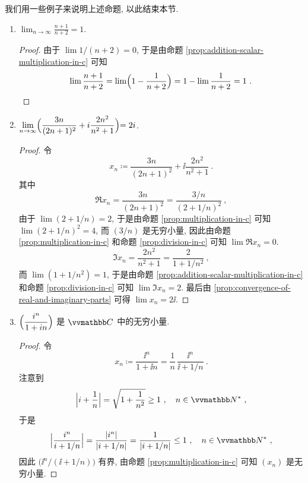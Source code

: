 我们用一些例子来说明上述命题, 以此结束本节.

\begin{example}
    \begin{enumerate}
        \item \(\displaystyle \lim_{n \to \infty} \frac{n + 1}{n + 2} = 1\).
        \begin{proof}
            由于 \(\lim 1 / (n + 2) = 0\), 于是由命题 \ref{prop:addition-scalar-multiplication-in-c} 可知
            \[
                \lim \frac{n + 1}{n + 2} = \lim\Bigl(1 - \frac{1}{n + 2}\Bigr) = 1 - \lim \frac{1}{n + 2} = 1\ .
            \]
        \end{proof}
        \item \(\displaystyle \lim_{n \to \infty} \Bigr(\frac{3 n}{(2 n + 1)^2} + i \frac{2 n^2}{n^2 + 1}\Bigl) = 2 i\).
        \begin{proof}
            令
            \[
                x_n \coloneqq \frac{3 n}{(2 n + 1)^2} + \ii \frac{2 n^2}{n^2 + 1}\ .
            \]
            其中
            \[
                \Re x_n = \frac{3 n}{(2 n + 1)^2} = \frac{3 / n}{(2 + 1 / n)^2}\ ,
            \]
            由于 \(\lim(2 + 1 / n) = 2\), 于是由命题 \ref{prop:multiplication-in-c} 可知 \(\lim(2 + 1 / n)^2 = 4\), 而 \((3 / n)\) 是无穷小量, 因此由命题 \ref{prop:multiplication-in-c} 和命题 \ref{prop:division-in-c} 可知 \(\lim \Re x_n = 0\).
            \[
                \Im x_n = \frac{2 n^2}{n^2 + 1} = \frac{2}{1 + 1 / n^2}\ ,
            \]
            而 \(\lim(1 + 1 / n^2) = 1\), 于是由命题 \ref{prop:addition-scalar-multiplication-in-c} 和命题 \ref{prop:division-in-c} 可知 \(\lim \Im x_n = 2\). 最后由 \ref{prop:convergence-of-real-and-imaginary-parts} 可得 \(\lim x_n = 2 \ii\).
        \end{proof}
        \item \(\displaystyle \Bigl(\frac{i^n}{1 + i n}\Bigr)\) 是 \(\C\) 中的无穷小量.
        \begin{proof}
            令
            \[
                x_n \coloneqq \frac{\ii^n}{1 + \ii n} = \frac{1}{n}\, \frac{\ii^n}{\ii + 1 / n}\ .
            \]
            注意到
            \[
                \Bigl|\ii + \frac{1}{n}\Bigr| = \sqrt{1 + \frac{1}{n^2}} \geq 1\ ,\quad n \in \N^\ast\ ,
            \]
            于是
            \[
                \Bigl|\frac{\ii^n}{\ii + 1 / n}\Bigr| = \frac{|\ii^n|}{|\ii + 1 / n|} = \frac{1}{|\ii + 1 / n|} \leq 1\ ,\quad n \in \N^\ast\ ,
            \]
            因此 \(\bigl(\ii^n \big/ (\ii + 1 / n)\bigr)\) 有界, 由命题 \ref{prop:multiplication-in-c} 可知 \((x_n)\) 是无穷小量.
        \end{proof}
    \end{enumerate}
\end{example}

